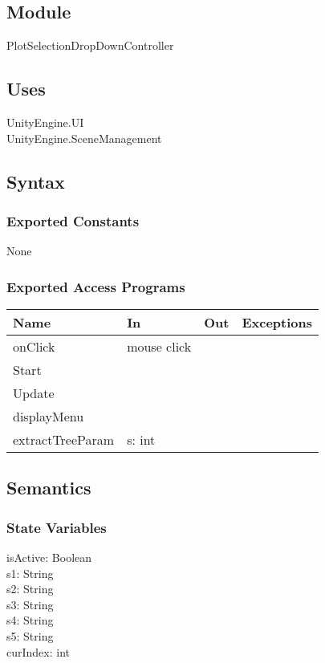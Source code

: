 \documentclass[12pt, titlepage]{article}
\begin{document}
\subsection{Module}
PlotSelectionDropDownController

\subsection{Uses}
UnityEngine.UI\\
UnityEngine.SceneManagement\\

\subsection{Syntax}
\subsubsection{Exported Constants}
None
\subsubsection{Exported Access Programs}

\begin{center}
\begin{tabular}{| l | l | l | p{5cm}|}
\hline
\textbf{Name} & \textbf{In} & \textbf{Out} & \textbf{Exceptions} \\
\hline
onClick & mouse click &  &  \\
\hline
Start &&&\\
\hline
Update &&&\\
\hline
displayMenu &&&\\
\hline
extractTreeParam & s: int &  &  \\
\hline
\end{tabular}
\end{center}

\subsection{Semantics}

\subsubsection{State Variables}
isActive: Boolean\\
s1: String\\
s2: String\\
s3: String\\
s4: String\\
s5: String\\
curIndex: int
\end{document}
